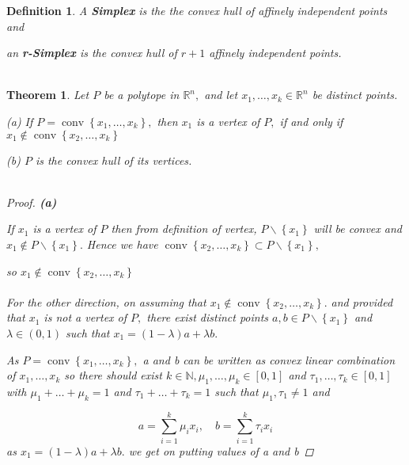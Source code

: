 \documentclass[oneside]{book}
\newtheorem{theorem}{Theorem}[section]
\newtheorem{mydef}{Definition}
\begin{document}
 



 

 
 
 
 
 
 




\begin{mydef}	
 A \textbf{Simplex} is the the convex hull of affinely independent points and \par 
  an \textbf{r-Simplex} is the convex hull of $r+ 1$ affinely independent points.
  \\\\
  \end{mydef} 


\begin{theorem}
\label{t:6}
Let $P$ be a polytope in $\mathbb{R}^{n},$ and let $x_{1}, \ldots, x_{k} \in \mathbb{R}^{n}$ be distinct points.\par
(a) If $P=\operatorname{conv}\left\{x_{1}, \ldots, x_{k}\right\},$ then $x_{1}$ is a vertex of $P,$ if and only if $x_{1} \notin \operatorname{conv}\left\{x_{2}, \ldots, x_{k}\right\}$ \par
(b) $P$ is the convex hull of its vertices. \\\\

\begin{proof}

\textbf{(a)}  \par 


 If  $x_{1}$ is a vertex of $P $ then  from definition of vertex, $P \backslash\left\{x_{1}\right\}$ will be convex and $x_{1} \notin P \backslash\left\{x_{1}\right\} .$ Hence we have  $\operatorname{conv}\left\{x_{2}, \ldots, x_{k}\right\} \subset P \backslash\left\{x_{1}\right\},$ 
 \par 
 so  $x_{1} \notin \operatorname{conv}\left\{x_{2}, \ldots, x_{k}\right\}$ \\\\
For the other direction, on assuming that $x_{1} \notin \operatorname{conv}\left\{x_{2}, \ldots, x_{k}\right\} .$ and provided that  $x_{1}$ is not a vertex of $P,$ there exist distinct points $a, b \in P \backslash\left\{x_{1}\right\}$ and $\lambda \in(0,1)$ such that $x_{1}=(1-\lambda) a+\lambda b .$ 

As  $P=\operatorname{conv}\left\{x_{1}, \ldots, x_{k}\right\},$ a and b can be written as convex linear combination of $x_{1},\ldots ,x_{k} $   so there should exist $k \in \mathbb{N}, \mu_{1}, \ldots, \mu_{k} \in[0,1]$ and $\tau_{1}, \ldots, \tau_{k} \in[0,1]$ with $\mu_{1}+\ldots+\mu_{k}=1$ and $\tau_{1}+\ldots+\tau_{k}=1$
such that $\mu_{1}, \tau_{1} \neq 1$ and \par
\begin{equation}
\label{eq37}
a=\sum_{i=1}^{k} \mu_{i} x_{i}, \quad b=\sum_{i=1}^{k} \tau_{i} x_{i}
\end{equation}  
as $x_{1}=(1-\lambda) a+\lambda b .$ we get on putting values of a and b 


\end{proof}
\end{theorem}
\end{document}

